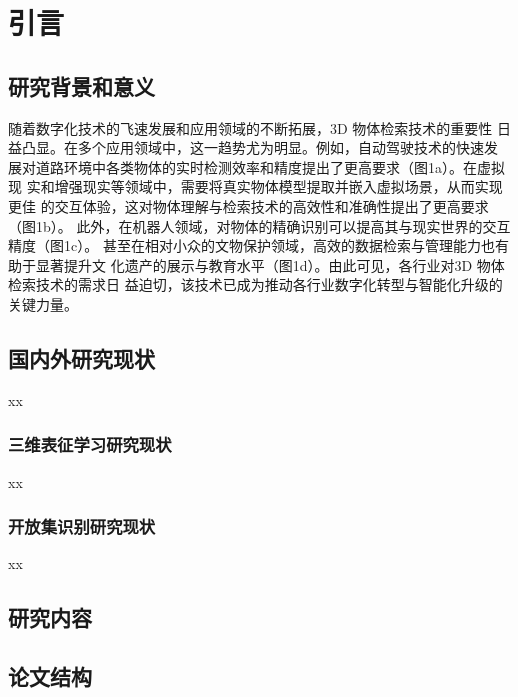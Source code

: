 \section{引言}

\subsection{研究背景和意义}
随着数字化技术的飞速发展和应用领域的不断拓展，3D 物体检索技术的重要性
日益凸显。在多个应用领域中，这一趋势尤为明显。例如，自动驾驶技术的快速发
展对道路环境中各类物体的实时检测效率和精度提出了更高要求（图1a）。在虚拟现
实和增强现实等领域中，需要将真实物体模型提取并嵌入虚拟场景，从而实现更佳
的交互体验，这对物体理解与检索技术的高效性和准确性提出了更高要求（图1b）。
此外，在机器人领域，对物体的精确识别可以提高其与现实世界的交互精度（图1c）。
甚至在相对小众的文物保护领域，高效的数据检索与管理能力也有助于显著提升文
化遗产的展示与教育水平（图1d）。由此可见，各行业对3D 物体检索技术的需求日
益迫切，该技术已成为推动各行业数字化转型与智能化升级的关键力量\parencite{ref3,ref4}。
\subsection{国内外研究现状}
xx
\subsubsection{三维表征学习研究现状}
xx
\subsubsection{开放集识别研究现状}
xx 

\subsection{研究内容}

\subsection{论文结构}
